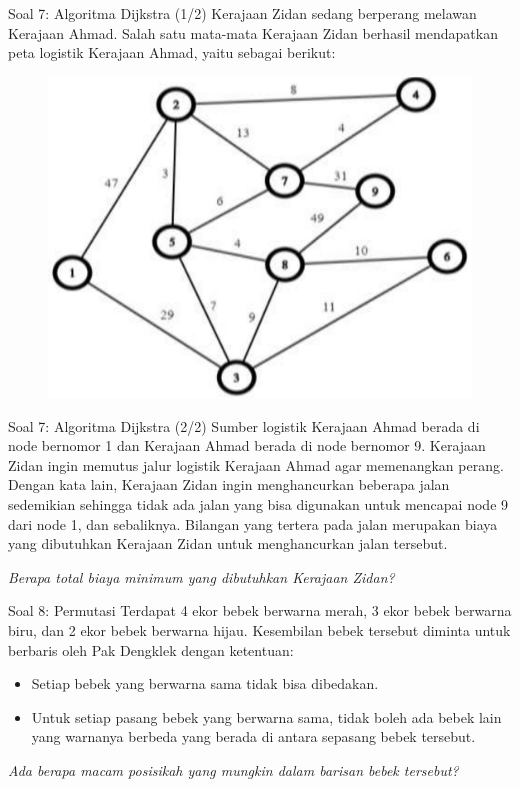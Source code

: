 \documentclass[english,t]{beamer}
\begin{document}
\begin{frame}{Soal 7: Algoritma Dijkstra (1/2)} 
Kerajaan Zidan sedang berperang melawan Kerajaan Ahmad. Salah satu mata-mata Kerajaan Zidan berhasil mendapatkan peta logistik Kerajaan Ahmad, yaitu sebagai berikut:
\begin{figure}[!ht]
	\centering
	\includegraphics[scale=.225]{images/soal-7-peta}
\end{figure}
\end{frame}

\begin{frame}{Soal 7: Algoritma Dijkstra (2/2)} 
Sumber logistik Kerajaan Ahmad berada di node bernomor 1 dan Kerajaan Ahmad berada di node bernomor 9. Kerajaan Zidan ingin memutus jalur logistik Kerajaan Ahmad agar memenangkan perang. Dengan kata lain, Kerajaan Zidan ingin menghancurkan beberapa jalan sedemikian sehingga tidak ada jalan yang bisa digunakan untuk mencapai node 9 dari node 1, dan sebaliknya. Bilangan yang tertera pada jalan merupakan biaya yang dibutuhkan Kerajaan Zidan untuk menghancurkan jalan tersebut. 

\bigskip
\textit{Berapa total biaya minimum yang dibutuhkan Kerajaan Zidan?}
\end{frame}


\begin{frame}{Soal 8: Permutasi}
Terdapat 4 ekor bebek berwarna merah, 3 ekor bebek berwarna biru, dan 2 ekor bebek berwarna hijau. Kesembilan bebek tersebut diminta untuk berbaris oleh Pak Dengklek dengan ketentuan:

\begin{itemize}
	\item Setiap bebek yang berwarna sama tidak bisa dibedakan.
	\item Untuk setiap pasang bebek yang berwarna sama, tidak boleh ada bebek lain yang warnanya berbeda yang berada di antara sepasang bebek tersebut.
\end{itemize}

\bigskip
\textit{Ada berapa macam posisikah yang mungkin dalam barisan bebek tersebut?}
\end{frame}
\end{document}
